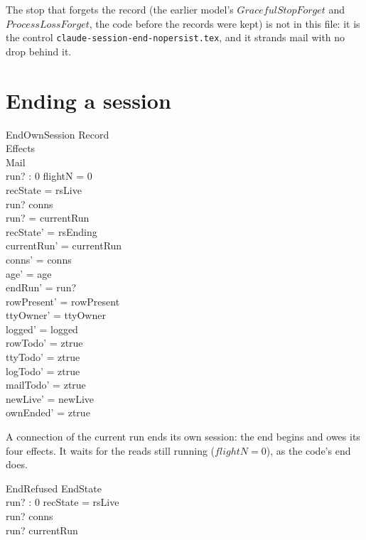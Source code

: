 \documentclass[a4paper,10pt,fleqn]{article}
\begin{document}
The stop that forgets the record (the earlier model's $GracefulStopForget$ and $ProcessLossForget$, the code before the
records were kept) is not in this file: it is the control
\texttt{claude-session-end-nopersist.tex}, and it strands mail with no drop behind it.

\section{Ending a session}

\begin{schema}{EndOwnSession}
  \Delta Record \\
  \Delta Effects \\
  \Xi Mail \\
  run? : 0 
  \where
  flightN = 0 \\
  recState = rsLive \\
  run? \in conns \\
  run? = currentRun \\
  recState' = rsEnding \\
  currentRun' = currentRun \\
  conns' = conns \\
  age' = age \\
  endRun' = run? \\
  rowPresent' = rowPresent \\
  ttyOwner' = ttyOwner \\
  logged' = logged \\
  rowTodo' = ztrue \\
  ttyTodo' = ztrue \\
  logTodo' = ztrue \\
  mailTodo' = ztrue \\
  newLive' = newLive \\
  ownEnded' = ztrue
\end{schema}

A connection of the current run ends its own session: the end begins and owes
its four effects.  It waits for the reads still running ($flightN = 0$), as the
code's end does.

\begin{schema}{EndRefused}
  \Xi EndState \\
  run? : 0 
  \where
  recState = rsLive \\
  run? \in conns \\
  run? \neq currentRun
\end{schema}
\end{document}

